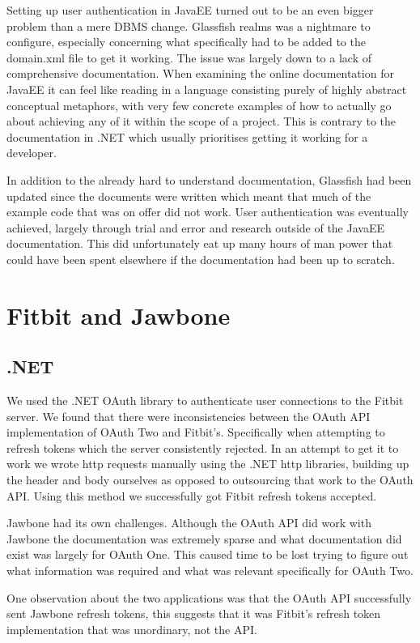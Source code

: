 Setting up user authentication in JavaEE turned out to be an even bigger problem than a mere DBMS change. Glassfish realms was a nightmare to configure, especially concerning what specifically had to be added to the domain.xml file to get it working. The issue was largely down to a lack of comprehensive documentation. When examining the online documentation for JavaEE it can feel like reading in a language consisting purely of highly abstract conceptual metaphors, with very few concrete examples of how to actually go about achieving any of it within the scope of a project. This is contrary to the documentation in .NET which usually prioritises getting it working for a developer. \par
In addition to the already hard to understand documentation, Glassfish had been updated since the documents were written which meant that much of the example code that was on offer did not work. User authentication was eventually achieved, largely through trial and error and research outside of the JavaEE documentation. This did unfortunately eat up many hours of man power that could have been spent elsewhere if the documentation had been up to scratch.
\section{Fitbit and Jawbone}
\subsection{.NET}
We used the .NET OAuth library to authenticate user connections to the Fitbit server. We found that there were inconsistencies between the OAuth API implementation of OAuth Two and Fitbit’s. Specifically when attempting to refresh tokens which the server consistently rejected. In an attempt to get it to work we wrote http requests manually using the .NET http libraries, building up the header and body ourselves as opposed to outsourcing that work to the OAuth API. Using this method we successfully got Fitbit refresh tokens accepted. \par
Jawbone had its own challenges. Although the OAuth API did work with Jawbone the documentation was extremely sparse and what documentation did exist was largely for OAuth One. This caused time to be lost trying to figure out what information was required and what was relevant specifically for OAuth Two. \par
One observation about the two applications was that the OAuth API successfully sent Jawbone refresh tokens, this suggests that it was Fitbit’s refresh token implementation that was unordinary, not the API.

